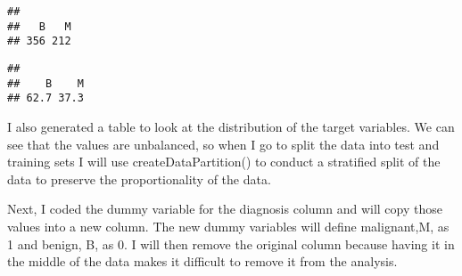 \documentclass[
]{article}
\newenvironment{Shaded}{\begin{snugshade}}{\end{snugshade}}
\newcommand{\AttributeTok}[1]{\textcolor[rgb]{0.77,0.63,0.00}{#1}}
\newcommand{\CommentTok}[1]{\textcolor[rgb]{0.56,0.35,0.01}{\textit{#1}}}
\newcommand{\DecValTok}[1]{\textcolor[rgb]{0.00,0.00,0.81}{#1}}
\newcommand{\FunctionTok}[1]{\textcolor[rgb]{0.00,0.00,0.00}{#1}}
\newcommand{\NormalTok}[1]{#1}
\newcommand{\OtherTok}[1]{\textcolor[rgb]{0.56,0.35,0.01}{#1}}
\newcommand{\SpecialCharTok}[1]{\textcolor[rgb]{0.00,0.00,0.00}{#1}}
\newcommand{\StringTok}[1]{\textcolor[rgb]{0.31,0.60,0.02}{#1}}
\begin{document}
\begin{verbatim}
## 
##   B   M 
## 356 212
\end{verbatim}

\begin{Shaded}
\end{Shaded}

\begin{verbatim}
## 
##    B    M 
## 62.7 37.3
\end{verbatim}

I also generated a table to look at the distribution of the target
variables. We can see that the values are unbalanced, so when I go to
split the data into test and training sets I will use
createDataPartition() to conduct a stratified split of the data to
preserve the proportionality of the data.

Next, I coded the dummy variable for the diagnosis column and will copy
those values into a new column. The new dummy variables will define
malignant,M, as 1 and benign, B, as 0. I will then remove the original
column because having it in the middle of the data makes it difficult to
remove it from the analysis.

\begin{Shaded}
\end{Shaded}
\end{document}
